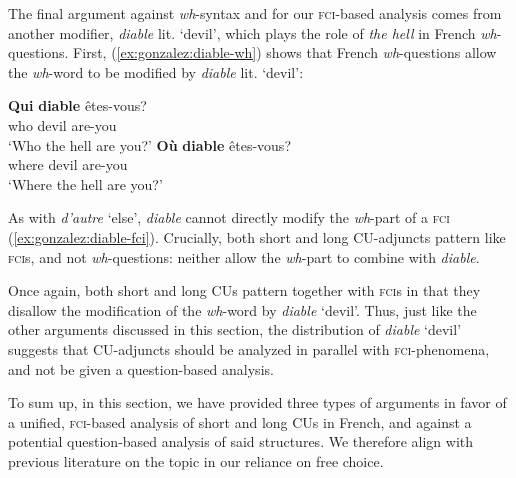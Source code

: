 \documentclass[output=paper]{langscibook}
\begin{document}
The final argument against \emph{wh}-syntax and for our \textsc{fci}-based analysis comes from another modifier, \emph{diable} lit. `devil', which plays the role of \emph{the hell} in French \emph{wh}-questions. First, (\ref{ex:gonzalez:diable-wh}) shows that French \emph{wh}-questions allow the \emph{wh}-word to be modified by \emph{diable} lit. `devil':

\ea \label{ex:gonzalez:diable-wh}
\ea 
\gll \textbf{Qui} \textbf{diable} êtes-vous? \\
 who devil are-you \\ \jambox{[Q]}
\glt `Who the hell are you?' 
\ex
\gll \textbf{Où} \textbf{diable} êtes-vous? \\
where devil are-you  \\ \jambox{[Q]}
\glt `Where the hell are you?' 
\z 

\z


As with \emph{d'autre} `else',  \textit{diable} cannot directly modify the \textit{wh}-part of a \textsc{fci} (\ref{ex:gonzalez:diable-fci}). Crucially, both short and long CU-adjuncts pattern like \textsc{fci}s, and not \emph{wh}-questions: neither allow the \textit{wh}-part to combine with \emph{diable}.


\ea
{}
\z 

\z


Once again, both short and long CUs pattern together with \textsc{fci}s in that they disallow the modification of the \emph{wh}-word by \emph{diable} `devil'. 
Thus, just like the other arguments discussed in this section, the distribution of \emph{diable} `devil' suggests that CU-adjuncts should be analyzed in parallel with \textsc{fci}-phenomena, and not be given a question-based analysis.


To sum up, in this section, we have provided three types of arguments in favor of a unified, \textsc{fci}-based analysis of short and long CUs in French, and against a potential question-based analysis of said structures. We therefore align with previous literature on the topic in our reliance on free choice.
\end{document}
